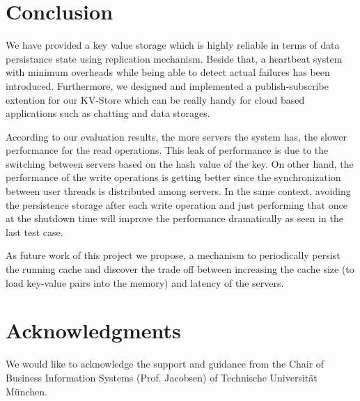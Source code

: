 \documentclass{sig-alternate}
\begin{document}
\section{Conclusion}
We have provided a key value storage which is highly reliable in terms of data persistance state using replication mechanism. Beside that, a heartbeat system with minimum overheads while being able to detect actual failures has been introduced. Furthermore, we designed and implemented a publish-subscribe extention for our KV-Store which can be really handy for cloud based applications such as chatting and data storages.

According to our evaluation results, the more servers the system has, the slower performance for the read operations. This leak of performance is due to the switching between servers based on the hash value of the key. On other hand, the performance of the write operations is getting better since the synchronization between user threads is distributed among servers. In the same context, avoiding the persistence storage after each write operation and just performing that once at the shutdown time will improve the performance dramatically as seen in the last test case.

As future work of this project we propose, a mechanism to periodically persist the running cache and discover the trade off between increasing the cache size (to load key-value pairs into the memory) and latency of the servers. 

\section{Acknowledgments}
We would like to acknowledge the support and guidance from the Chair of Business Information Systems (Prof. Jacobsen) of Technische Universit{\"a}t M{\"u}nchen.
%

%
%

\end{document}
